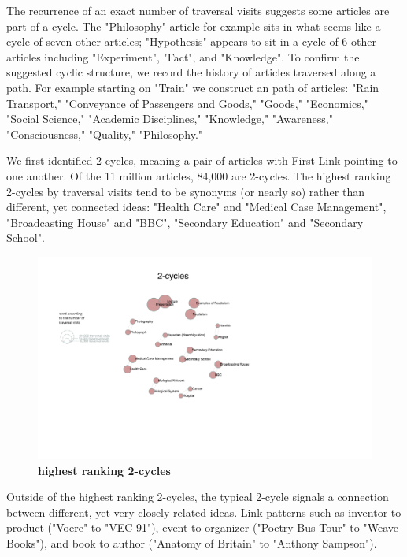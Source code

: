 \documentclass[pre,twocolumn,twoside,superscriptaddress,floatfix, aps, 10pt]{revtex4-1}
\begin{document}
The recurrence of an exact number of traversal visits suggests some articles are part of a cycle. 
The "Philosophy" article for example sits in what seems like a cycle of seven other articles; "Hypothesis" appears to sit in a 
cycle of 6 other articles including "Experiment", "Fact", and "Knowledge".
To confirm the suggested cyclic structure, we record the history of articles traversed along a path. For example starting on "Train" we construct an path of articles: 
"Rain Transport,"
"Conveyance of Passengers and Goods," 
"Goods," 
"Economics,"
"Social Science,"
"Academic Disciplines,"
"Knowledge,"
"Awareness,"
"Consciousness,"
"Quality,"
"Philosophy."

We first identified 2-cycles, meaning a pair of articles with First Link pointing to one another.
Of the 11 million articles, 84,000 are 2-cycles. 
The highest ranking 2-cycles by traversal visits tend to be synonyms (or nearly so) rather than different, yet connected ideas:
"Health Care" and "Medical Case Management", "Broadcasting House" and "BBC", "Secondary Education" and "Secondary School".

\begin{figure}[tp!]
  \centering	
  \includegraphics[width=\textwidth]{graphics/2_cycles.pdf}
  \caption{
    \textbf{highest ranking 2-cycles}
  }
  \label{fig:2-cycles}

\end{figure}

Outside of the highest ranking 2-cycles, the typical 2-cycle signals a connection between different, yet very closely related ideas. 
Link patterns such as inventor to product ("Voere" to "VEC-91"), event to organizer ("Poetry Bus Tour" to "Weave Books"), and book to author ("Anatomy of Britain" to "Anthony Sampson").
\end{document}

